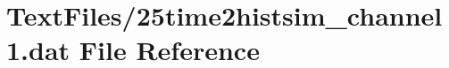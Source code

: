 \hypertarget{25time2histsim__channel1_8dat}{}\section{Text\+Files/25time2histsim\+\_\+channel1.dat File Reference}
\label{25time2histsim__channel1_8dat}
